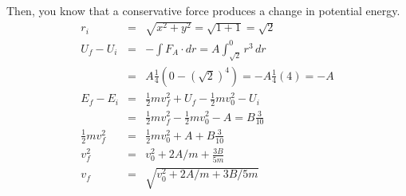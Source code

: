 \documentclass[11pt]{amsart}
\begin{document}
Then, you know that a conservative force produces a change in potential energy. \\
\begin{eqnarray*} 
r_{i} &=&\sqrt{x^{2}+y^{2}} = \sqrt{1+1} = \sqrt{2} \\
U_{f}-U_{i} &=& -\int{F_{A}\cdot{dr}} = A\int_{\sqrt{2}}^{0}r^{3}\,dr \\
&=&A\frac{1}{4}(0-(\sqrt{2})^{4}) = -A\frac{1}{4}(4) = -A \\
E_{f}-E_{i} &=& \frac{1}{2}mv_{f}^{2} + U_{f} -\frac{1}{2}mv_{0}^{2} - U_{i} \\
&=& \frac{1}{2}mv_{f}^{2}-\frac{1}{2}mv_{0}^{2} -A = B\frac{3}{10} \\
\frac{1}{2}mv_{f}^{2} &=& \frac{1}{2}mv_{0}^{2} + A + B\frac{3}{10} \\
v_{f}^{2} &=& v_{0}^{2} +2A/m +\frac{3B}{5m} \\
v_{f} &=& \sqrt{v_{0}^{2} +2A/m+3B/5m} 
\end{eqnarray*} \\
\end{document}
